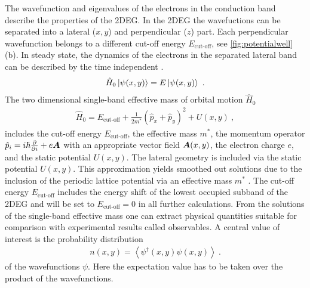The wavefunction and eigenvalues of the electrons in the conduction band describe the properties of the 2DEG. In the 2DEG the wavefuctions can be separated into a lateral ($x,y$) and perpendicular ($z$) part. Each perpendicular wavefunction belongs to a different cut-off energy $E_{\text{cut-off}}$, see \cref{fig:potentialwell}(b).
In steady state, the dynamics of the electrons in the separated lateral band can be described by the time independent \sdg{}.
\begin{align}
 \hat{H}_0\left| \psi(x,y) \right> = E \left| \psi(x,y) \right>\ .
	\label{eqn:effectivemasssdg}
\end{align}
The two dimensional single-band effective mass \hamil{} of orbital motion $\hat{H}_0$
\begin{align}
\hat{H}_0 = E_{\text{cut-off}} + \frac{1}{2m^*}(\hat{p}_{x}+\hat{p}_{y})^2+U(x,y)\ ,
\end{align}
includes the cut-off energy $E_{\text{cut-off}}$, the effective mass $m^*$, the momentum operator $\hat{p}_i = i\hbar \frac{\partial }{\partial i} + e\boldsymbol{A}$ with an appropriate vector field $\boldsymbol{A}(x,y)$, the electron charge $e$, and the static potential $U(x,y)$.
The lateral geometry is included via the static potential $U(x,y)$.
This approximation yields smoothed out solutions due to the inclusion of the periodic lattice potential via an effective mass $m^*$ \cite{BastardBrum1986}.
The cut-off energy $E_{\text{cut-off}}$ includes the energy shift of the lowest occupied subband of the 2DEG and will be set to $E_{\text{cut-off}} = 0$ in all further calculations.
From the solutions of the single-band effective mass \sdg{} one can extract physical quantities suitable for comparison with experimental results called observables.
A central value of interest is the probability distribution
\begin{align}
	n(x,y) = \left< \psi^{\dagger} (x,y) \psi(x,y)\right>\ .
	\label{eqn:analyticalelectrondensity}
\end{align}
of the wavefunctions $\psi$. Here the expectation value has to be taken over the product of the wavefunctions.\par
